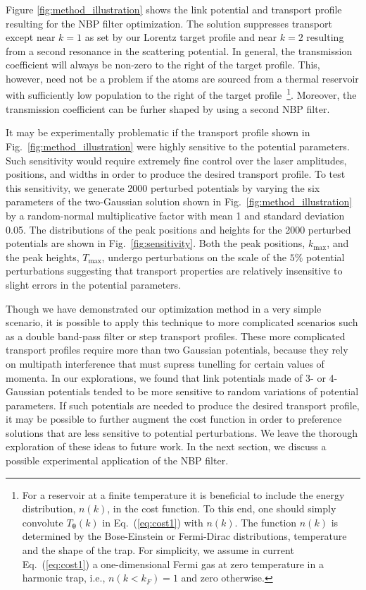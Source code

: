 \documentclass[twocolumn,amsmath,amssymb,showpacs,pra,superscriptaddress,aps]{revtex4-1}
\begin{document}
Figure \ref{fig:method_illustration} shows the link potential and transport profile resulting for the NBP filter optimization. {\color{blue} The solution suppresses transport except near $k=1$ as set by our Lorentz target profile and near $k=2$ resulting from a second resonance in the scattering potential. 
In general, the transmission coefficient will always be non-zero to the right of the target profile. 
This, however, need not be a problem if the atoms are sourced from a thermal reservoir with sufficiently low population to the right of the target profile~\footnote{For a reservoir at a finite temperature it is beneficial to include the energy distribution, $n(k)$,
in the cost function. To this end, one should simply convolute $T_{\bm{\theta}}(k)$ in Eq.~(\ref{eq:cost1}) with $n(k)$. 
The function $n(k)$ is determined by the Bose-Einstein or Fermi-Dirac distributions, temperature and the shape of the trap. For simplicity, 
we assume in current Eq.~(\ref{eq:cost1}) a one-dimensional Fermi gas at zero temperature in a harmonic trap, i.e., $n(k<k_F)=1$ and zero otherwise.}.
Moreover, the transmission coefficient can be furher shaped by using a second NBP filter.}
 
It may be experimentally problematic if the transport profile shown in Fig.~\ref{fig:method_illustration} were highly sensitive to the potential parameters. Such sensitivity would require extremely fine control over the laser amplitudes, positions, and widths in order to produce the desired transport profile. To test this sensitivity, we generate 2000 perturbed potentials by varying the six parameters of the two-Gaussian solution shown in Fig.~\ref{fig:method_illustration} by a random-normal multiplicative factor with mean 1 and standard deviation 0.05. The distributions of the peak positions and heights for the 2000 perturbed potentials are shown in Fig.~\ref{fig:sensitivity}. Both the peak positions, $k_{\mathrm{max}}$, and the peak heights, $T_{\mathrm{max}}$, undergo perturbations on the scale of the $5\%$  potential perturbations suggesting that transport properties are relatively insensitive to slight errors in the potential parameters. 

Though we have demonstrated our optimization method in a very simple scenario, it is possible to apply this technique to more complicated scenarios such as a double band-pass filter or step transport profiles.  {\color{blue} These more complicated transport profiles require more than two Gaussian potentials,
because they rely on multipath interference that must supress tunelling for certain values of momenta.} In our explorations, we found that link potentials made of 3- or 4-Gaussian potentials tended to be more sensitive to random variations of potential parameters. If such potentials are needed to produce the desired transport profile, it may be possible to further augment the cost function in order to preference solutions that are less sensitive to potential perturbations. We leave the thorough exploration of these ideas to future work. In the next section, we discuss a possible experimental application of the NBP filter.
\end{document}

